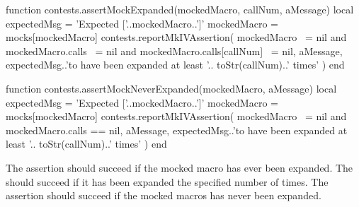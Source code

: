 \startLuaCode
function contests.assertMockExpanded(mockedMacro, callNum, aMessage)
  local expectedMsg = 'Expected ['..mockedMacro..']'
  mockedMacro = mocks[mockedMacro]
  contests.reportMkIVAssertion(
    mockedMacro ~= nil
    and mockedMacro.calls ~= nil
    and mockedMacro.calls[callNum] ~= nil,
    aMessage,
    expectedMsg..'to have been expanded at least '..
      toStr(callNum)..' times'
  )
end

function contests.assertMockNeverExpanded(mockedMacro, aMessage)
  local expectedMsg = 'Expected ['..mockedMacro..']'
  mockedMacro = mocks[mockedMacro]
  contests.reportMkIVAssertion(
    mockedMacro ~= nil
    and mockedMacro.calls == nil,
    aMessage,
    expectedMsg..'to have been expanded at least '..
      toStr(callNum)..' times'
  )
end
\stopLuaCode


The \type{\assertMockExpanded} assertion should succeed if the mocked 
macro has ever been expanded. The \type{\assertMockExpandedNTimes} should 
succeed if it has been expanded the specified number of times. The 
\type{\assertMockNeverExpanded} assertion should succeed if the mocked 
macros has never been expanded. 

\startConTest
\startMocking
  \aTexMockZeroArgs
  \startAssertShouldFail{}{}{}
  \stopAssertShouldFail
\stopMocking
\stopConTest

\stopTestCase

\startConTest
\startMocking
  \startAssertShouldFail{}{}{}
  \stopAssertShouldFail
  \aContextMock
  \startAssertShouldFail{}{}{}
  \stopAssertShouldFail
  \startAssertShouldFail{}{}{}
  \stopAssertShouldFail
\stopMocking
\stopConTest
\stopTestCase
\stopTestSuite

\startTestSuite[assertMockNthArgumentOnMthExpansionMatches]

\startMkIVCode
\def\assertMockNthArgumentOnMthExpansionMatches#1#2#3#4#5{%
  \directlua{%
    thirddata.contests.assertMockArguments(
      '#1', #3, #2, '#4', '#5'
    )
  }
}
\stopMkIVCode

